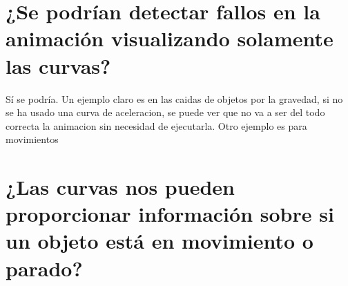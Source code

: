 \documentclass{article}
\begin{document}


\section{¿Se podrían detectar fallos en la animación visualizando solamente las curvas?}

Sí se podría. Un ejemplo claro es en las caidas de objetos por la gravedad, si no se ha usado una curva de aceleracion, se puede ver que no va a ser del todo correcta la animacion sin necesidad de ejecutarla. Otro ejemplo es para movimientos

\section{¿Las curvas nos pueden proporcionar información sobre si un objeto está en movimiento o parado?}
\end{document}

